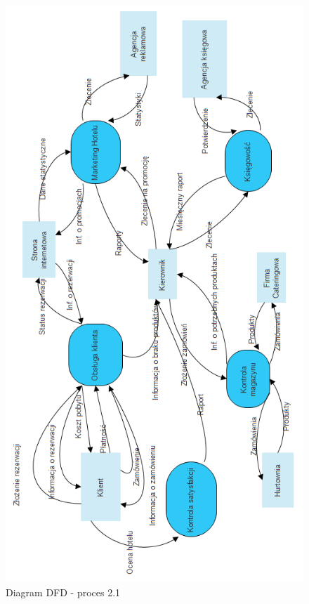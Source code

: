 \documentclass[a4paper, 11pt]{article}
\begin{document}
	\begin{figure}[H]%
			\center
			\includegraphics[scale=0.7]{Img/DFDpoziom0.png}
			\caption{Diagram DFD - proces 2.1}
	\end{figure}
\end{document}
